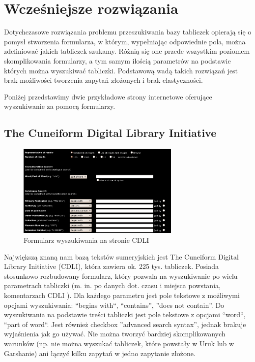 \chapter{Wcześniejsze rozwiązania}\label{r:losers}

Dotychczasowe rozwiązania problemu przeszukiwania bazy tabliczek opierają się o pomysł stworzenia formularza, w którym, wypełniając odpowiednie pola, można zdefiniować jakich tabliczek szukamy. Różnią się one przede wszystkim poziomem skomplikowania formularzy,
 a tym samym ilością parametrów na podstawie których można wyszukiwać tabliczki. Podstawową wadą takich rozwiązań jest brak możliwości tworzenia zapytań złożonych i brak elastyczności.

Poniżej przedstawimy dwie przykładowe strony internetowe oferujące wyszukiwanie za pomocą formularzy.
\section{The Cuneiform Digital Library Initiative \cite{cdli}}
\begin{figure}[h]
 \centering
 \includegraphics[width=300px]{../diagramy/cdli-search.png}
 \caption{Formularz wyszukiwania na stronie CDLI}
 \label{fig:cdli-search}
\end{figure}
Największą znaną nam bazą tekstów sumeryjskich jest The Cuneiform Digital Library Initiative (CDLI), która zawiera ok. 225 tys. tabliczek. Posiada stosunkowo rozbudowany formularz, który pozwala na wyszukiwanie po wielu parametrach tabliczki (m. in. po danych dot. czasu i miejsca powstania, komentarzach CDLI
). Dla każdego parametru jest pole tekstowe z możliwymi opcjami wyszukiwania: ``begins with``, ``contains'', ''does not contain''. Do wyszukiwania na podstawie treści tabliczki jest pole tekstowe z opcjami ``word``, ``part of word``. Jest również checkbox ''advanced search syntax'', jednak brakuje wyjaśnienia jak go używać.
Nie można tworzyć bardziej skomplikowanych warunków (np. nie można wyszukać tabliczek, które powstały w Uruk lub w Garshanie) ani łączyć kilku zapytań w jedno zapytanie złożone.

